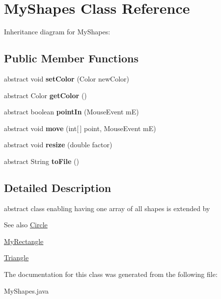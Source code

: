 \hypertarget{classMyShapes}{}\section{My\+Shapes Class Reference}
\label{classMyShapes}


Inheritance diagram for My\+Shapes\+:
\subsection*{Public Member Functions}
\begin{DoxyCompactItemize}
\item 
\mbox{\label{classMyShapes_a0807315569fc9820e4f174e33ee6f364}} 
abstract void {\bfseries set\+Color} (Color new\+Color)
\item 
\mbox{\label{classMyShapes_a18d6107bac7fdd5beef6f63a67889284}} 
abstract Color {\bfseries get\+Color} ()
\item 
\mbox{\label{classMyShapes_a930f699fed3edf63501af5bd19868874}} 
abstract boolean {\bfseries point\+In} (Mouse\+Event mE)
\item 
\mbox{\label{classMyShapes_a0ecf28fd5ececb2f4c6a88be499e17c4}} 
abstract void {\bfseries move} (int\mbox{[}$\,$\mbox{]} point, Mouse\+Event mE)
\item 
\mbox{\label{classMyShapes_a86e18ec352a71724fac8f1ee0d660481}} 
abstract void {\bfseries resize} (double factor)
\item 
\mbox{\label{classMyShapes_aa72eba96c3d61701e7a6dd1ce3ab79e8}} 
abstract String {\bfseries to\+File} ()
\end{DoxyCompactItemize}


\subsection{Detailed Description}
abstract class enabling having one array of all shapes is extended by \begin{DoxySeeAlso}{See also}
\hyperlink{classCircle}{Circle} 

\hyperlink{classMyRectangle}{My\+Rectangle} 

\hyperlink{classTriangle}{Triangle} 
\end{DoxySeeAlso}


The documentation for this class was generated from the following file\+:\begin{DoxyCompactItemize}
\item 
My\+Shapes.\+java\end{DoxyCompactItemize}
